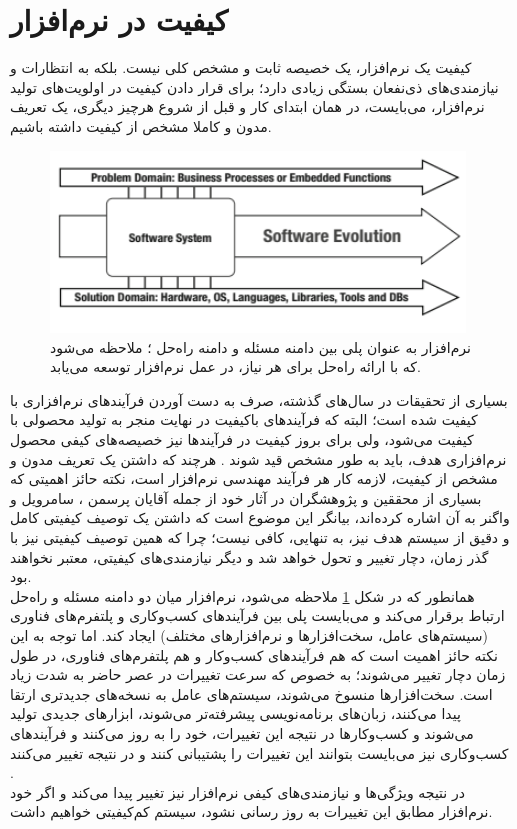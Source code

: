 \section{کیفیت در نرم‌افزار}
کیفیت یک نرم‌افزار، یک خصیصه ثابت و مشخص کلی نیست. بلکه به انتظارات و نیازمندی‌های ذی‌نفعان بستگی زیادی دارد؛ برای قرار دادن کیفیت در اولویت‌های تولید نرم‌افزار، می‌بایست، در همان ابتدای کار و قبل از شروع هرچیز دیگری، یک تعریف مدون و کاملا مشخص از کیفیت داشته باشیم.\\
\begin{figure}[H]
	\centering\includegraphics[width=11cm]{Resources/mediator.PNG}
	\caption[نرم‌افزار به عنوان پلی بین دامنه مسئله و دامنه راه‌حل]
	{نرم‌افزار به عنوان پلی بین دامنه مسئله و دامنه راه‌حل
		\cite{wagner_software_2013}؛
		ملاحظه می‌شود که با ارائه راه‌حل برای هر نیاز، در عمل نرم‌افزار توسعه می‌یابد.
	}
	\label{fig:mediator}
\end{figure}
بسیاری از تحقیقات در سال‌های گذشته، صرف به دست آوردن فرآیندهای نرم‌افزاری با کیفیت شده است؛ البته که فرآیندهای باکیفیت در نهایت منجر به تولید محصولی با کیفیت می‌شود، ولی برای بروز کیفیت در فرآیندها نیز خصیصه‌های کیفی محصول نرم‌افزاری هدف، باید به طور مشخص قید شوند
\cite{sommerville_software_2016}.
هرچند که داشتن یک تعریف مدون و مشخص از کیفیت، لازمه کار هر فرآیند مهندسی نرم‌افزار است، نکته حائز اهمیتی که بسیاری از محققین و پژوهشگران در آثار خود از جمله آقایان پرسمن
\cite{pressman_software_2015}،
سامرویل
\cite{sommerville_software_2016}
و واگنر
\cite{wagner_software_2013}
به آن اشاره کرده‌اند، بیانگر این موضوع است که داشتن یک توصیف کیفیتی  کامل و دقیق از سیستم هدف نیز، به تنهایی، کافی نیست؛ چرا که همین توصیف کیفیتی نیز با گذر زمان، دچار تغییر و تحول خواهد شد و دیگر نیازمندی‌های کیفیتی، معتبر نخواهند بود.\\
همانطور که در شکل
\ref{fig:mediator}
ملاحظه می‌شود، نرم‌افزار میان دو دامنه مسئله و راه‌حل ارتباط برقرار می‌کند و می‌بایست پلی بین فرآیند‌های کسب‌وکاری و پلتفرم‌های فناوری (سیستم‌های عامل، سخت‌افزارها و نرم‌افزارهای مختلف) ایجاد کند. اما توجه به این نکته حائز اهمیت است که هم فرآیندهای کسب‌وکار و هم پلتفرم‌های فناوری، در طول زمان دچار تغییر می‌شوند؛ به خصوص که سرعت تغییرات در عصر حاضر به شدت زیاد است. سخت‌افزارها منسوخ می‌شوند، سیستم‌های عامل به نسخه‌های جدیدتری ارتقا پیدا می‌کنند، زبان‌های برنامه‌نویسی پیشرفته‌تر می‌شوند، ابزارهای جدیدی تولید می‌شوند و کسب‌وکارها در نتیجه این تغییرات، خود را به روز می‌کنند و فرآیندهای کسب‌وکاری نیز می‌بایست بتوانند این تغییرات را پشتیبانی کنند و در نتیجه تغییر می‌کنند
\cite{wagner_software_2013}.\\
در نتیجه ویژگی‌ها و نیازمندی‌های کیفی نرم‌افزار نیز تغییر پیدا می‌کند و اگر خود نرم‌افزار مطابق این تغییرات به روز رسانی نشود، سیستم کم‌کیفیتی خواهیم داشت.
